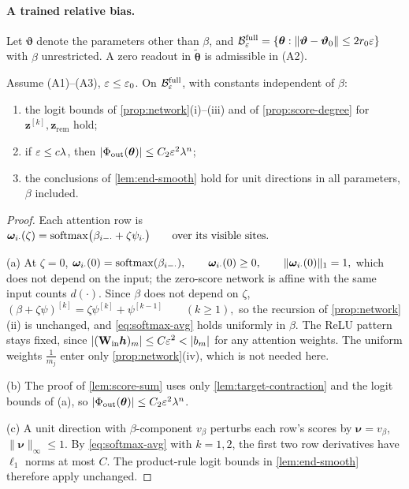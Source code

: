 \paragraph{A trained relative bias.} Let $\bm\vartheta$ denote the parameters other than $\beta$, and
$\mathcal B^{\mathrm{full}}_{\varepsilon}=\{\bm\theta:\|\bm\vartheta-\bm\vartheta_0\|\le2r_0\varepsilon\}$ with $\beta$ unrestricted. A zero readout in $\tilde{\bm\theta}$ is admissible in (A2).

\begin{lemma}
\label{lem:bias-uniform}
Assume (A1)--(A3), $\varepsilon\le\varepsilon_0$. On $\mathcal B^{\mathrm{full}}_{\varepsilon}$, with constants independent of $\beta$:
\begin{enumerate}[label=(\alph*),leftmargin=*,itemsep=3pt,topsep=4pt]
\item the logit bounds of \cref{prop:network}(i)--(iii) and of \cref{prop:score-degree} for $\bm z^{[k]},\bm z_{\mathrm{rem}}$ hold;
\item if $\varepsilon\le c\lambda$, then $|\Phi_{\mathrm{out}}(\bm\theta)|\le C_2\varepsilon^2\lambda^n$;
\item the conclusions of \cref{lem:end-smooth} hold for unit directions in all parameters, $\beta$ included.
\end{enumerate}
\end{lemma}

\begin{proof}
Each attention row is
 $\bm\omega_{i\cdot}(\zeta)=\operatorname{softmax}\bigl(\beta_{i-\cdot}+\zeta\psi_{i\cdot}\bigr)\qquad\text{over its visible sites.}$ 

\noindent(a) At $\zeta=0$,
 $\bm\omega_{i\cdot}(0)=\operatorname{softmax}(\beta_{i-\cdot}),\qquad \bm\omega_{i\cdot}(0)\ge0,\qquad \|\bm\omega_{i\cdot}(0)\|_1=1,$ 
which does not depend on the input; the zero-score network is affine with the same input counts $d(\cdot)$. Since $\beta$ does not
depend on $\zeta$,
 $(\beta+\zeta\psi)^{[k]}=\zeta\psi^{[k]}+\psi^{[k-1]}\qquad(k\ge1),$ 
so the recursion of \cref{prop:network}(ii) is unchanged, and \cref{eq:softmax-avg} holds uniformly in $\beta$. The ReLU pattern stays
fixed, since $|(\mathbf W_{\mathrm{in}}\bm h)_m|\le C\initscale^2<|b_m|$ for any attention weights. The uniform weights $\frac{1}{m_j}$ enter only
\cref{prop:network}(iv), which is not needed here.

\smallskip\noindent(b) The proof of \cref{lem:score-sum} uses only \cref{lem:target-contraction} and the logit bounds of (a), so
$|\Phi_{\mathrm{out}}(\bm\theta)|\le C_2\varepsilon^2\lambda^n$.

\smallskip\noindent(c) A unit direction with $\beta$-component $v_\beta$ perturbs each row's scores by $\bm\nu=v_\beta$, $\|\bm\nu\|_\infty\le1$. By
\cref{eq:softmax-avg} with $k=1,2$, the first two row derivatives have $\ell_1$ norms at most $C$. The product-rule logit bounds in \cref{lem:end-smooth} therefore apply unchanged.
\end{proof}

